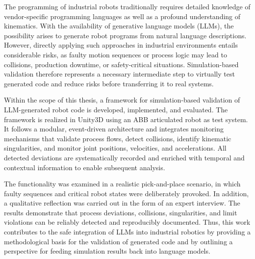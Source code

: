 The programming of industrial robots traditionally requires detailed
knowledge of vendor-specific programming languages as well as a
profound understanding of kinematics. With the availability of
generative language models (LLMs), the possibility arises to generate
robot programs from natural language descriptions. However, directly
applying such approaches in industrial environments entails
considerable risks, as faulty motion sequences or process logic may
lead to collisions, production downtime, or safety-critical
situations. Simulation-based validation therefore represents a
necessary intermediate step to virtually test generated code and
reduce risks before transferring it to real systems.

Within the scope of this thesis, a framework for simulation-based
validation of LLM-generated robot code is developed, implemented, and
evaluated. The framework is realized in Unity3D using an ABB
articulated robot as test system. It follows a modular, event-driven
architecture and integrates monitoring mechanisms that validate
process flows, detect collisions, identify kinematic singularities,
and monitor joint positions, velocities, and accelerations. All
detected deviations are systematically recorded and enriched with
temporal and contextual information to enable subsequent analysis.

The functionality was examined in a realistic pick-and-place
scenario, in which faulty sequences and critical robot states were
deliberately provoked. In addition, a qualitative reflection was
carried out in the form of an expert interview. The results
demonstrate that process deviations, collisions, singularities, and
limit violations can be reliably detected and reproducibly
documented. Thus, this work contributes to the safe integration of
LLMs into industrial robotics by providing a methodological basis for
the validation of generated code and by outlining a perspective for
feeding simulation results back into language models.
